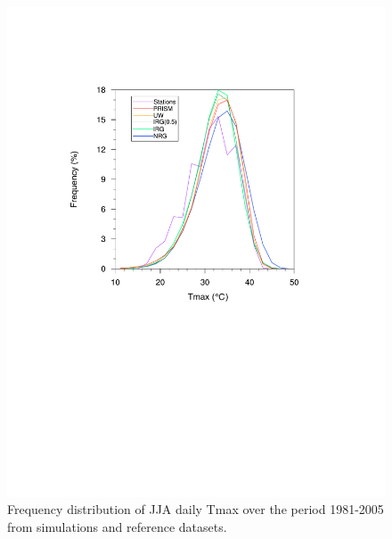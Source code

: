 \documentclass[draft,ms]{agutex}   %
\begin{document}
\begin{figure}
\begin{center}
\includegraphics[width=6in]{irrig_pdf.pdf}
\caption{Frequency distribution of JJA daily Tmax over the period 1981-2005 from simulations and reference datasets.}
\label{fig:Figure 5}
\end{center}
\end{figure}
\end{document}
